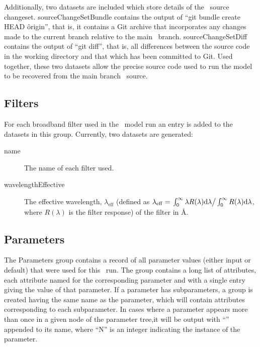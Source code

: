 Additionally, two datasets are included which store details of the \glc\ source changeset. {\normalfont \ttfamily sourceChangeSetBundle} contains the output of ``{\normalfont \ttfamily git bundle create HEAD \^origin}'', that is, it contains a Git archive that incorporates any changes made to the current branch relative to the main \glc\ branch. {\normalfont \ttfamily sourceChangeSetDiff} contains the output of ``{\normalfont \ttfamily git diff}'', that is, all differences between the source code in the working directory and that which has been committed to Git. Used together, these two datasets allow the precise source code used to run the model to be recovered from the main branch \glc\ source.

\subsection{Filters}

For each broadband filter used in the \glc\ model run an entry is added to the datasets in this group. Currently, two datasets are generated:
\begin{description}
\item[{\normalfont \ttfamily name}] The name of each filter used.
\item[{\normalfont \ttfamily wavelengthEffective}] The effective wavelength, $\lambda_\mathrm{eff}$ (defined as $\lambda_\mathrm{eff}=\left. \int_0^\infty \lambda R(\lambda) \mathrm{d}\lambda \right/ \int_0^\infty R(\lambda) \mathrm{d}\lambda$, where $R(\lambda)$ is the filter response) of the filter in \AA.
\end{description}

\subsection{Parameters}

The {\normalfont \ttfamily Parameters} group contains a record of all parameter values (either input or default) that were used for this \glc\ run. The group contains a long list of attributes, each attribute named for the corresponding parameter and with a single entry giving the value of that parameter. If a parameter has subparameters, a group is created having the same name as the parameter, which will contain attributes corresponding to each subparameter. In cases where a parameter appears more than once in a given node of the parameter tree,it will be output with ``{\normalfont \ttfamily [N]}'' appended to its name, where ``{\normalfont \ttfamily N}'' is an integer indicating the instance of the parameter.

